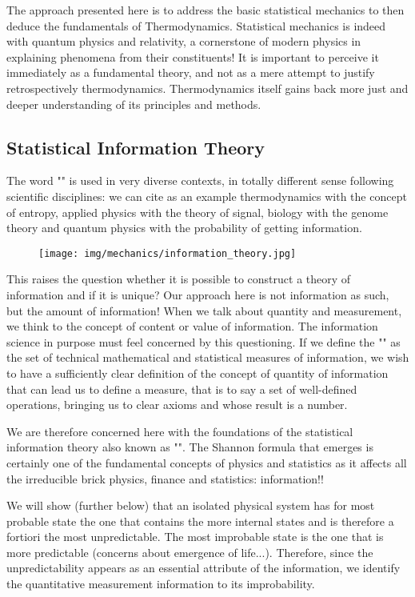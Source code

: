 	The approach presented here is to address the basic statistical mechanics to then deduce the fundamentals of Thermodynamics. Statistical mechanics is indeed with quantum physics and relativity, a cornerstone of modern physics in explaining phenomena from their constituents! It is important to perceive it immediately as a fundamental theory, and not as a mere attempt to justify retrospectively thermodynamics. Thermodynamics itself gains back more just and deeper understanding of its principles and methods.
	
	\subsection{Statistical Information Theory}
	
	The word "" is used in very diverse contexts, in totally different sense following scientific disciplines: we can cite as an example thermodynamics with the concept of entropy, applied physics with the theory of signal, biology with the genome theory and quantum physics with the probability of getting information.
	\begin{figure}[H]
		\centering
		\texttt{[image: img/mechanics/information\_theory.jpg]}
	\end{figure}
	This raises the question whether it is possible to construct a theory of information and if it is unique? Our approach here is not information as such, but the amount of information! When we talk about quantity and measurement, we think to the concept of content or value of information. The information science in purpose must feel concerned by this questioning. If we define the "" as the set of technical mathematical and statistical measures of information, we wish to have a sufficiently clear definition of the concept of quantity of information that can lead us to define a measure, that is to say a set of well-defined operations, bringing us to clear axioms and whose result is a number.
	
	We are therefore concerned here with the foundations of the statistical information theory also known as "". The Shannon formula that emerges is certainly one of the fundamental concepts of physics and statistics as it affects all the irreducible brick physics, finance and statistics: information!!
	
	We will show (further below) that an isolated physical system has for most probable state the one that contains the more internal states and is therefore a fortiori the most unpredictable. The most improbable state is the one that is more predictable (concerns about emergence of life...). Therefore, since the unpredictability appears as an essential attribute of the information, we identify the quantitative measurement information to its improbability.
	
